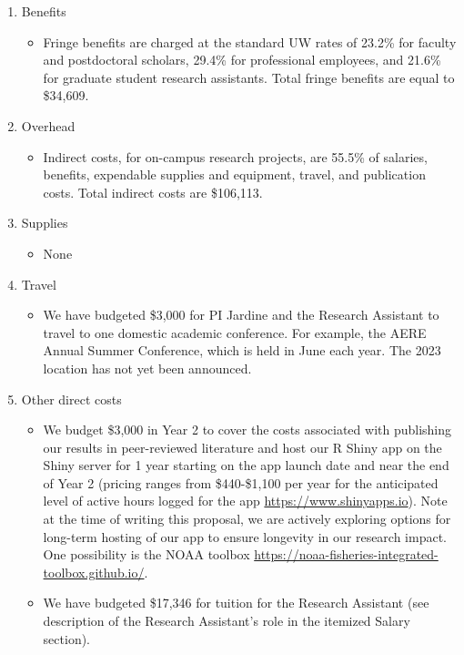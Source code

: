 \begin{enumerate}
\begin{itemize}
\end{itemize}
\item Benefits
\begin{itemize}
\item Fringe benefits are charged at the standard UW rates of 23.2\% for faculty and postdoctoral scholars, 29.4\% for professional employees, and 21.6\% for graduate student research assistants. Total fringe benefits are equal to \$34,609.
\end{itemize}
\item Overhead
\begin{itemize}
\item Indirect costs, for on-campus research projects, are 55.5\% of salaries, benefits, expendable supplies and equipment, travel, and publication costs. Total indirect costs are \$106,113.
\end{itemize}
\item Supplies
\begin{itemize}
\item None
\end{itemize}
\item Travel
\begin{itemize}
\item We have budgeted \$3,000 for PI Jardine and the Research Assistant to travel to one domestic academic conference. For example, the AERE Annual Summer Conference, which is held in June each year. The 2023 location has not yet been announced.
\end{itemize}
\item Other direct costs
\begin{itemize}
\item We budget \$3,000 in Year 2 to cover the costs associated with publishing our results in peer-reviewed literature and host our R Shiny app on the Shiny server for 1 year starting on the app launch date and near the end of Year 2 (pricing ranges from \$440-\$1,100 per year for the anticipated level of active hours logged for the app \url{https://www.shinyapps.io}). Note at the time of writing this proposal, we are actively exploring options for long-term hosting of our app to ensure longevity in our research impact. One possibility is the NOAA toolbox \url{https://noaa-fisheries-integrated-toolbox.github.io/}.
\item We have budgeted \$17,346 for tuition for the Research Assistant (see description of the Research Assistant's role in the itemized Salary section).

\end{itemize}
\end{enumerate}
